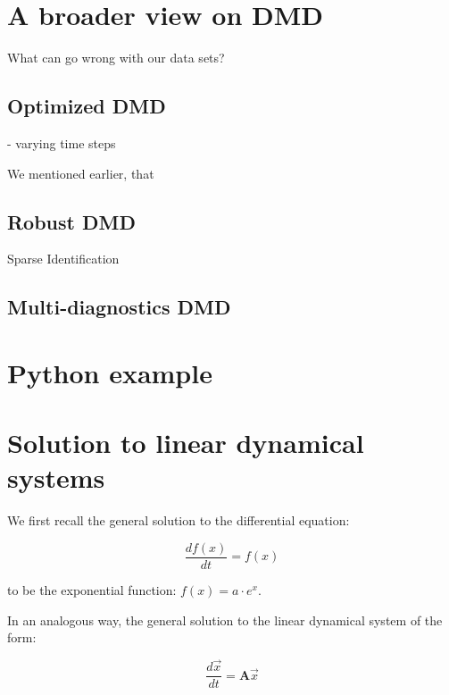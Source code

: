 \documentclass[10pt,twocolumn]{article}
\begin{document}
\section{A broader view on DMD} \label{sec:view}

What can go wrong with our data sets?

\subsection{Optimized DMD}

- varying time steps

We mentioned earlier, that 

\subsection{Robust DMD}



Sparse Identification




\subsection{Multi-diagnostics DMD}

\section{Python example}



\appendix

\section{Solution to linear dynamical systems} \label{app:A}

We first recall the general solution to the differential equation:

\begin{equation} \label{eq:DE_exp}
\frac{d f(x)}{dt} = f(x)
\end{equation}

to be the exponential function: $f(x) = a \cdot e^{x}$.


In an analogous way, the general solution to the linear dynamical system of the form:

\begin{equation} \label{eq:system_linear_A}
\frac{d \vec{x}}{dt} = \bm{A} \vec{x}
\end{equation}
\end{document}
